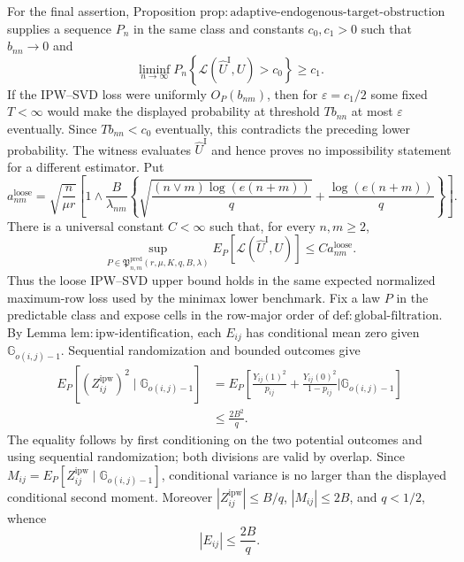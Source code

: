For the final assertion, Proposition \(\mathrm{prop:adaptive\mbox{-}endogenous\mbox{-}target\mbox{-}obstruction}\) supplies a sequence \(P_n\) in the same class and constants \(c_0,c_1>0\) such that \(b_{nn}\to0\) and
\[
 \liminf_{n\to\infty}P_n\!\left\{
 \mathcal L(\widehat U^{\mathrm I},U)>c_0\right\}\ge c_1.
\]
If the IPW--SVD loss were uniformly \(O_P(b_{nm})\), then for \(\varepsilon=c_1/2\) some fixed \(T<\infty\) would make the displayed probability at threshold \(Tb_{nn}\) at most \(\varepsilon\) eventually.  Since \(Tb_{nn}<c_0\) eventually, this contradicts the preceding lower probability.  The witness evaluates \(\widehat U^{\mathrm I}\) and hence proves no impossibility statement for a different estimator.
Put
\[
 a^{\mathrm{loose}}_{nm}=
 \sqrt{\frac n{\mu r}}\left[1\wedge
 \frac B{\lambda_{nm}}\left\{
 \sqrt{\frac{(n\vee m)\log(e(n+m))}{q}}+
 \frac{\log(e(n+m))}{q}\right\}\right].
\]
There is a universal constant \(C<\infty\) such that, for every \(n,m\ge2\),
\[
 \sup_{P\in\mathfrak P^{\mathrm{pred}}_{n,m}(r,\mu,K,q,B,\lambda)}
 E_P\!\left[\mathcal L(\widehat U^{\mathrm I},U)\right]
 \le C a^{\mathrm{loose}}_{nm}.
\]
Thus the loose IPW--SVD upper bound holds in the same expected normalized maximum-row loss used by the minimax lower benchmark.
Fix a law \(P\) in the predictable class and expose cells in the row-major order of \(\mathrm{def:global\mbox{-}filtration}\).  By Lemma \(\mathrm{lem:ipw\mbox{-}identification}\), each \(E_{ij}\) has conditional mean zero given \(\mathbb G_{o(i,j)-1}\).  Sequential randomization and bounded outcomes give
\[
 \begin{aligned}
 E_P\!\left[(Z^{\mathrm{ipw}}_{ij})^2
 \mid\mathbb G_{o(i,j)-1}\right]
 &=E_P\!\left[
 \frac{Y_{ij}(1)^2}{p_{ij}}+
 \frac{Y_{ij}(0)^2}{1-p_{ij}}
 \mathrel{\Big|}\mathbb G_{o(i,j)-1}\right]\\
 &\le \frac{2B^2}{q}.
 \end{aligned}
\]
The equality follows by first conditioning on the two potential outcomes and using sequential randomization; both divisions are valid by overlap.  Since \(M_{ij}=E_P[Z^{\mathrm{ipw}}_{ij}\mid\mathbb G_{o(i,j)-1}]\), conditional variance is no larger than the displayed conditional second moment.  Moreover \(|Z^{\mathrm{ipw}}_{ij}|\le B/q\), \(|M_{ij}|\le2B\), and \(q<1/2\), whence
\[
 |E_{ij}|\le \frac{2B}{q}.
\]

